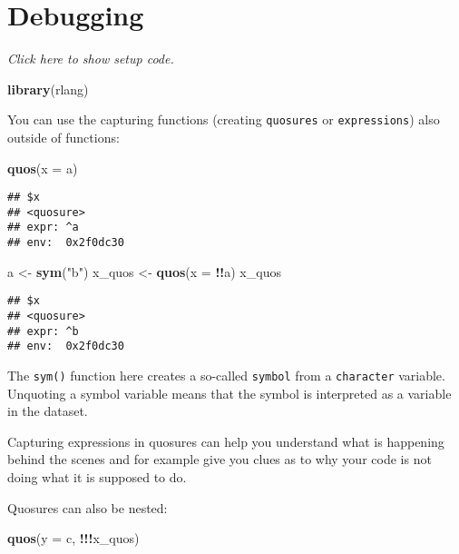 \documentclass[]{book}
\newenvironment{Shaded}{\begin{snugshade}}{\end{snugshade}}
\newcommand{\DataTypeTok}[1]{\textcolor[rgb]{0.13,0.29,0.53}{#1}}
\newcommand{\KeywordTok}[1]{\textcolor[rgb]{0.13,0.29,0.53}{\textbf{#1}}}
\newcommand{\NormalTok}[1]{#1}
\newcommand{\OperatorTok}[1]{\textcolor[rgb]{0.81,0.36,0.00}{\textbf{#1}}}
\newcommand{\StringTok}[1]{\textcolor[rgb]{0.31,0.60,0.02}{#1}}
\begin{document}
\hypertarget{debugging}{%
\section{Debugging}\label{debugging}}

\emph{Click here to show setup code.}

\begin{Shaded}
\begin{Highlighting}[]
\KeywordTok{library}\NormalTok{(rlang)}
\end{Highlighting}
\end{Shaded}

You can use the capturing functions (creating \texttt{quosures} or \texttt{expressions}) also outside of functions:

\begin{Shaded}
\begin{Highlighting}[]
\KeywordTok{quos}\NormalTok{(}\DataTypeTok{x =}\NormalTok{ a)}
\end{Highlighting}
\end{Shaded}

\begin{verbatim}
## $x
## <quosure>
## expr: ^a
## env:  0x2f0dc30
\end{verbatim}

\begin{Shaded}
\begin{Highlighting}[]
\NormalTok{a <-}\StringTok{ }\KeywordTok{sym}\NormalTok{(}\StringTok{"b"}\NormalTok{)}
\NormalTok{x_quos <-}\StringTok{ }\KeywordTok{quos}\NormalTok{(}\DataTypeTok{x =} \OperatorTok{!!}\NormalTok{a)}
\NormalTok{x_quos}
\end{Highlighting}
\end{Shaded}

\begin{verbatim}
## $x
## <quosure>
## expr: ^b
## env:  0x2f0dc30
\end{verbatim}

The \texttt{sym()} function here creates a so-called \texttt{symbol} from a \texttt{character} variable.
Unquoting a symbol variable means that the symbol is interpreted as a variable in the dataset.

Capturing expressions in quosures can help you understand what is happening behind the scenes and for example give you clues as to why your code is not doing what it is supposed to do.

Quosures can also be nested:

\begin{Shaded}
\begin{Highlighting}[]
\KeywordTok{quos}\NormalTok{(}\DataTypeTok{y =}\NormalTok{ c, }\OperatorTok{!!!}\NormalTok{x_quos)}
\end{Highlighting}
\end{Shaded}
\end{document}
